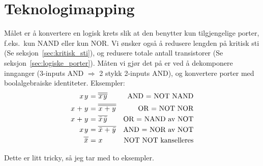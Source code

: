 \documentclass[12pt,a4paper,norsk]{article}
\begin{document}
\section{Teknologimapping}\label{sec:tekonologimapping}
Målet er å konvertere en logisk krets slik at den benytter kun tilgjengelige
porter, f.eks.\ kun NAND eller kun NOR\@. Vi
ønsker også å redusere lengden på kritisk sti (Se seksjon~\ref{sec:kritisk_sti}), og
redusere totale antall transistorer (Se seksjon~\ref{sec:logiske_porter}). Måten vi
gjør det på er ved å dekomponere innganger (3-inputs AND $\Rightarrow$ 2 stykk 2-inputs
AND), og konvertere porter med boolalgebraiske identiteter. Eksempler:
\begin{align*}
  \var{x}\var{y} &= \overline{\overline{\var{x}\var{y}}} & \text{AND = NOT
                                                           NAND} \\
  \var{x}+\var{y} &= \overline{\overline{\var{x}+\var{y}}} & \text{OR = NOT
                                                           NOR} \\
  \var{x}+\var{y} &= \overline{\kom{x}\kom{y}} & \text{OR = NAND av NOT} \\
  \var{x}\var{y} &= \overline{\kom{x}+\kom{y}} & \text{AND = NOR av NOT} \\
  \overline{\kom{x}} &= \var{x} & \text{NOT NOT kanselleres}
\end{align*}

Dette er litt tricky, så jeg tar med to eksempler.
\end{document}

